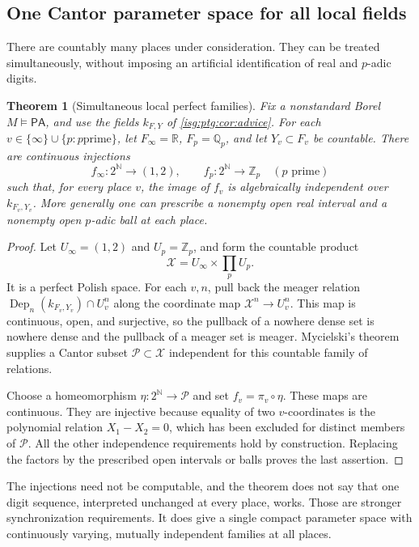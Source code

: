 \documentclass[11pt]{article}
\newtheorem{theorem}{Theorem}[section]
\theoremstyle{definition}
\theoremstyle{remark}
\newcommand{\R}{\mathbb{R}}
\newcommand{\N}{\mathbb{N}}
\newcommand{\Qp}{\mathbb{Q}_p}
\newcommand{\Zp}{\mathbb{Z}_p}
\newcommand{\PA}{\mathsf{PA}}
\newcommand{\Dep}{\operatorname{Dep}}
\begin{document}
\subsection{One Cantor parameter space for all local fields}
There are countably many places under consideration. They can be treated
simultaneously, without imposing an artificial identification of real and
$p$-adic digits.

\begin{theorem}[Simultaneous local perfect families]\label{isg:ptg:thm:simultaneous}
Fix a nonstandard Borel $M\models\PA$, and use the fields $k_{F,Y}$ of
\cref{isg:ptg:cor:advice}. For each $v\in\{\infty\}\cup\{p:p\text{
prime}\}$, let $F_\infty=\R$, $F_p=\Qp$, and let $Y_v\subset F_v$ be
countable. There are continuous injections
\[
 f_\infty:2^\N\to(1,2),\qquad
 f_p:2^\N\to\Zp\quad(p\text{ prime})
\]
such that, for every place $v$, the image of $f_v$ is algebraically
independent over $k_{F_v,Y_v}$. More generally one can prescribe a nonempty
open real interval and a nonempty open $p$-adic ball at each place.
\end{theorem}
\begin{proof}
Let $U_\infty=(1,2)$ and $U_p=\Zp$, and form the countable product
\[
 \mathcal X=U_\infty\times\prod_p U_p.
\]
It is a perfect Polish space. For each $v,n$, pull back the meager relation
$\Dep_n(k_{F_v,Y_v})\cap U_v^n$ along the coordinate map
$\mathcal X^n\to U_v^n$. This map is continuous, open, and surjective, so
the pullback of a nowhere dense set is nowhere dense and the pullback of a
meager set is meager. Mycielski's theorem supplies a Cantor subset
$\mathcal P\subset\mathcal X$ independent for this countable family of
relations.

Choose a homeomorphism $\eta:2^\N\to\mathcal P$ and set
$f_v=\pi_v\circ\eta$. These maps are continuous. They are injective because
equality of two $v$-coordinates is the polynomial relation $X_1-X_2=0$,
which has been excluded for distinct members of $\mathcal P$. All the other
independence requirements hold by construction. Replacing the factors by
the prescribed open intervals or balls proves the last assertion.
\end{proof}

The injections need not be computable, and the theorem does not say that
one digit sequence, interpreted unchanged at every place, works. Those are
stronger synchronization requirements. It does give a single compact
parameter space with continuously varying, mutually independent families
at all places.
\end{document}
